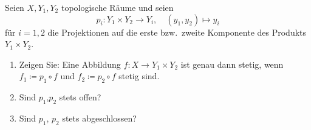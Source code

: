 \newpage
\begin{assignment}
  Seien \( X, Y_1, Y_2 \) topologische Räume und seien
  \begin{equation*}
    p_i: Y_1 \times Y_2 \to Y_i, \quad (y_1,y_2) \mapsto y_i
  \end{equation*}
  für \( i = 1,2 \) die Projektionen auf die erste bzw.\ zweite Komponente des Produkts \( Y_1 \times Y_2 \).
  \begin{enumerate}[label=(\alph*)]
    \item Zeigen Sie: Eine Abbildung \( f: X \to Y_1 \times Y_2 \) ist genau dann stetig, wenn \( f_1 \coloneqq p_1 \circ f \) und \( f_2 \coloneqq p_2 \circ f \) stetig sind.
    \item Sind \( p_1 \),\( p_2 \) stets offen?
    \item Sind \( p_1 \), \( p_2 \) stets abgeschlossen?
  \end{enumerate}
\end{assignment}
